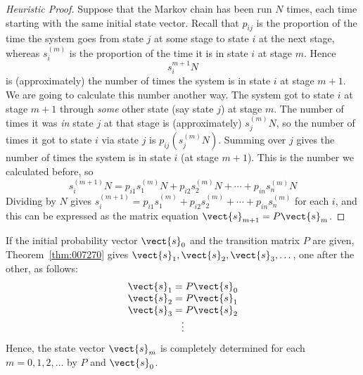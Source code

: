 \begin{proof}[Heuristic Proof]
Suppose that the Markov chain has been run $N$ times, each time starting with the same initial state vector. Recall that $p_{ij}$ is the proportion of the time the system goes from state $j$ at some stage to state $i$ at the next stage, whereas $s_{i}^{(m)}$ is the proportion of the time it is in state $i$ at stage $m$. Hence
\begin{equation*}
s_{i}^{m+1}N
\end{equation*}
is (approximately) the number of times the system is in state $i$ at stage $m + 1$. We are going to calculate this number another way. The system got to state $i$ at stage $m + 1$ through \textit{some} other state (say state $j$) at stage $m$. The number of times it was \textit{in} state $j$ at that stage is (approximately) $s_{j}^{(m)}N$, so the number of times it got to state $i$ via state $j$ is $p_{ij}(s_{j}^{(m)}N)$. Summing over $j$ gives the number of times the system is in state $i$ (at stage $m + 1$). This is the number we calculated before, so
\begin{equation*}
s_{i}^{(m+1)}N = p_{i1}s_{1}^{(m)}N + p_{i2}s_{2}^{(m)}N + \cdots + p_{in}s_{n}^{(m)}N
\end{equation*}
Dividing by $N$ gives $s_{i}^{(m+1)} = p_{i1}s_{1}^{(m)} + p_{i2}s_{2}^{(m)} + \cdots + p_{in}s_{n}^{(m)}$ for each $i$, and this can be expressed as the matrix equation $\vect{s}_{m+1} = P\vect{s}_{m}$.
\end{proof}

If the initial probability vector $\vect{s}_{0}$ and the transition matrix $P$ are given, Theorem~\ref{thm:007270} gives $\vect{s}_{1}, \vect{s}_{2}, \vect{s}_{3}, \dots$, one after the other, as follows:
\begin{equation*}
\begin{array}{c}
\vect{s}_{1} = P\vect{s}_0 \\
\vect{s}_{2} = P\vect{s}_1 \\
\vect{s}_{3} = P\vect{s}_2 \\
\vdots
\end{array}
\end{equation*}
Hence, the state vector $\vect{s}_{m}$ is completely determined for each $m = 0, 1, 2, \dots$ by $P$ and $\vect{s}_{0}$.


